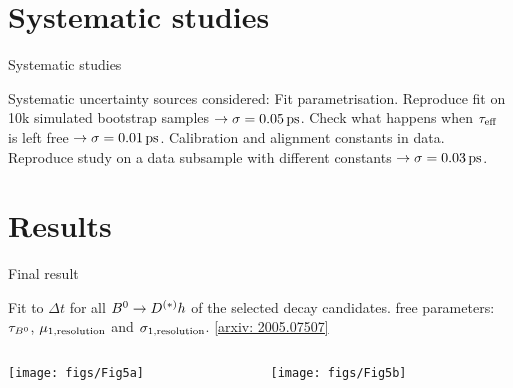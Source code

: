 \section{Systematic studies}
\begin{frame}{Systematic studies}
\bi

\itemi Systematic uncertainty sources considered:
\bi
\itemi Fit parametrisation.
\bi
\itemii Reproduce fit on 10k simulated bootstrap samples $\rightarrow\sigma=0.05{\rm \,ps}$.
\itemii Check what happens when $\tau_{\rm eff}$ is left free $\rightarrow\sigma=0.01{\rm \,ps}$.
\ei
\itemi Calibration and alignment constants in data.
\bi
\itemii Reproduce study on a data subsample with different constants $\rightarrow\sigma=0.03{\rm \,ps}$.
\ei
\ei
\ei
\end{frame}
\section{Results}
\begin{frame}{Final result}
\bi
\item Fit to $\Delta t$ for all $B^0\rightarrow D^{(*)}h$ of the selected decay candidates.
\bi
{} free parameters: $\tau_{B^0}$, $\mu_{1,{\rm resolution}}$ and $\sigma_{1,{\rm resolution}}$.
\ei
\ei
{\small \hfill \href{https://arxiv.org/abs/2005.07507}{\color{blue!40!gray}[arxiv: 2005.07507]}}
\begin{columns}
\begin{column}{0.5\linewidth} 
\texttt{[image: figs/Fig5a]} 
\end{column}
\begin{column}{0.5\linewidth}
\texttt{[image: figs/Fig5b]} 
\end{column}
\end{columns}
\end{frame}
